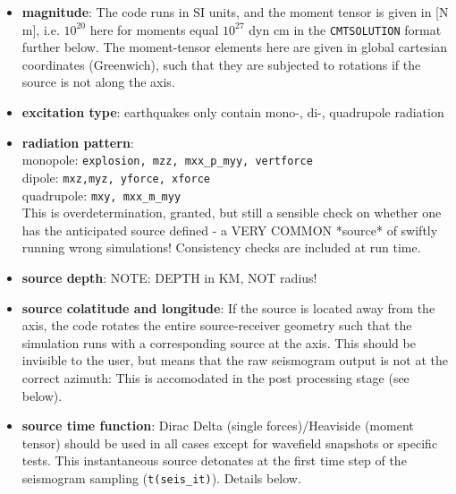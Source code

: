 \documentclass[11pt,letter,fleqn,english,notitlepage]{article}
\begin{document}
\begin{itemize}
    \item  \textbf{magnitude}: The code runs in SI units, and the moment tensor
    is given in [N m], i.e. $10^{20}$ here for moments equal $10^{27}$ dyn cm
    in the {\tt CMTSOLUTION} format further below. The moment-tensor elements
    here are given in global cartesian coordinates (Greenwich), such that they
    are subjected to rotations if the source is not along the axis.

    \item \textbf{excitation type}: earthquakes only contain mono-, di-,
    quadrupole radiation

    \item \textbf{radiation pattern}: \\
    monopole: {\tt explosion, mzz, mxx\_p\_myy, vertforce}\\
    dipole: {\tt mxz,myz, yforce, xforce} \\
    quadrupole: {\tt mxy, mxx\_m\_myy}\\
    This is overdetermination, granted, but still a sensible check on whether 
    one has the anticipated source defined - a VERY COMMON *source* of swiftly 
    running wrong simulations! Consistency checks are included at run time.

    \item \textbf{source depth}: NOTE: DEPTH in KM, NOT radius!

    \item \textbf{source colatitude and longitude}: If the source is located
    away from the axis, the code rotates the entire source-receiver geometry
    such that the simulation runs with a corresponding source at the axis. This
    should be invisible to the user, but means that the raw seismogram output
    is not at the correct azimuth: This is accomodated in the post processing
    stage (see below). 

    \item  \textbf{source time function}: Dirac Delta (single forces)/Heaviside
    (moment tensor) should be used in all cases except for wavefield snapshots
    or specific tests.  This instantaneous source detonates at the first time
    step of the seismogram sampling ({\tt t(seis\_it)}). Details below.
\end{itemize}

\\
\lstset{frame=single,basicstyle=\footnotesize, breaklines=true }

\end{document}
